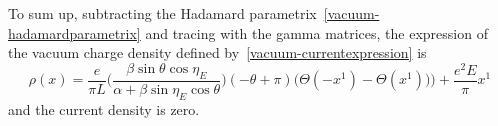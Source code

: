 To sum up,
subtracting the Hadamard parametrix~\cref{vacuum-hadamardparametrix} and tracing with the gamma matrices, 
the expression of the vacuum charge density defined by~\cref{vacuum-currentexpression} is
\begin{equation}\label{vacuum-rho-with-field}
\rho(x) = \frac{e}{\pi L}\Big( \frac{\beta \sin \theta \cos \eta_E}{\alpha + \beta \sin \eta_E \cos \theta}\Big) (-\theta + \pi)
\Big(\Theta(- x^1) - \Theta(x^1))\Big) + \frac{e^2 E}{\pi} x^1
\end{equation}
and the current density is zero. 
